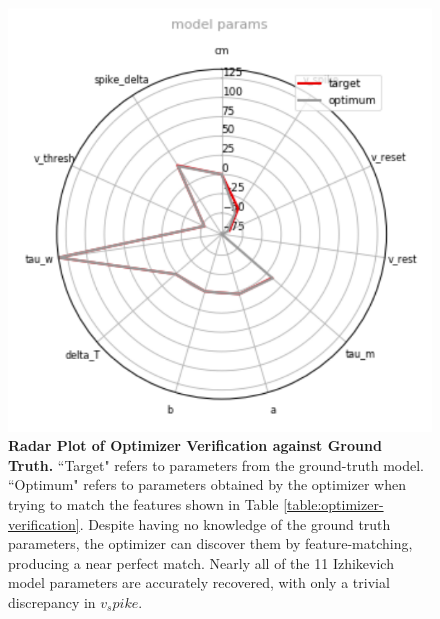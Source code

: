 \clearpage
\begin{figure}
    \centering
    \includegraphics[scale=0.75]{figures/radar_coordinates.png}
    \caption[Radar Plot of Optimizer Verification against Ground Truth]{\textbf{Radar Plot of Optimizer Verification against Ground Truth.}
    ``Target" refers to parameters from the ground-truth model.
    ``Optimum" refers to parameters obtained by the optimizer when trying to match the features shown in Table \ref{table:optimizer-verification}.
    Despite having no knowledge of the ground truth parameters,
    the optimizer can discover them by feature-matching, producing a near perfect match.
    Nearly all of the 11 Izhikevich model parameters are accurately recovered, with only a trivial discrepancy in $v_spike$.
    }
    \label{fig:optimizer-verification-radar}
\end{figure}

